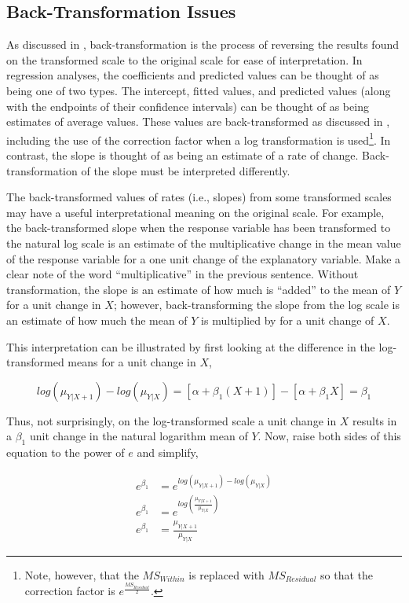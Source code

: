 \documentclass[10pt,openany]{book}\usepackage[]{graphicx}\usepackage[]{color}
\begin{document}
\subsection*{Back-Transformation Issues}
As discussed in , back-transformation is the process of reversing the results found on the transformed scale to the original scale for ease of interpretation.  In regression analyses, the coefficients and predicted values can be thought of as being one of two types.  The intercept, fitted values, and predicted values (along with the endpoints of their confidence intervals) can be thought of as being estimates of average values.  These values are back-transformed as discussed in , including the use of the correction factor when a log transformation is used\footnote{Note, however, that the $MS_{Within}$ is replaced with $MS_{Residual}$ so that the correction factor is $e^{\frac{MS_{Residual}}{2}}$.}.  In contrast, the slope is thought of as being an estimate of a rate of change.  Back-transformation of the slope must be interpreted differently.

The back-transformed values of rates (i.e., slopes) from some transformed scales may have a useful interpretational meaning on the original scale.  For example, the back-transformed slope when the response variable has been transformed to the natural log scale is an estimate of the multiplicative change in the mean value of the response variable for a one unit change of the explanatory variable.  Make a clear note of the word ``multiplicative'' in the previous sentence.  Without transformation, the slope is an estimate of how much is ``added'' to the mean of $Y$ for a unit change in $X$; however, back-transforming the slope from the log scale is an estimate of how much the mean of $Y$ is multiplied by for a unit change of $X$.

This interpretation can be illustrated by first looking at the difference in the log-transformed means for a unit change in $X$,

\[log\left(\mu_{Y|X+1}\right)-log\left(\mu_{Y|X}\right) = \left[\alpha+\beta_{1}(X+1)\right] - \left[\alpha+\beta_{1}X\right] = \beta_{1}\]

Thus, not surprisingly, on the log-transformed scale a unit change in $X$ results in a $\beta_{1}$ unit change in the natural logarithm mean of $Y$.  Now, raise both sides of this equation to the power of $e$ and simplify,

\[ \begin{split}
  e^{\beta_{1}} &= e^{log(\mu_{Y|X+1})-log(\mu_{Y|X})} \\
  e^{\beta_{1}} &= e^{log\left(\frac{\mu_{Y|X+1}}{\mu_{Y|X}}\right)} \\
  e^{\beta_{1}} &= \frac{\mu_{Y|X+1}}{\mu_{Y|X}}
\end{split} \]
\end{document}

